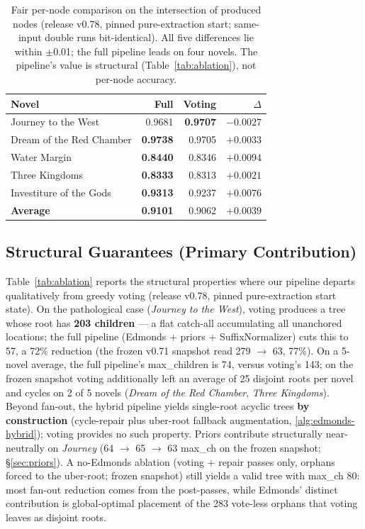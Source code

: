 \documentclass[11pt]{article}
\begin{document}
\begin{table}[h]
\centering
\scriptsize
\setlength{\tabcolsep}{4pt}
\begin{tabular}{lrrr}
\toprule
\textbf{Novel} & \textbf{Full} & \textbf{Voting} & \textbf{$\Delta$} \\
\midrule
Journey to the West & 0.9681 & \textbf{0.9707} & $-0.0027$ \\
Dream of the Red Chamber & \textbf{0.9738} & 0.9705 & $+0.0033$ \\
Water Margin & \textbf{0.8440} & 0.8346 & $+0.0094$ \\
Three Kingdoms & \textbf{0.8333} & 0.8313 & $+0.0021$ \\
Investiture of the Gods & \textbf{0.9313} & 0.9237 & $+0.0076$ \\
\midrule
\textbf{Average} & \textbf{0.9101} & 0.9062 & $+0.0039$ \\
\bottomrule
\end{tabular}
\caption{Fair per-node comparison on the intersection of produced nodes (release v0.78, pinned pure-extraction start; same-input double runs bit-identical). All five differences lie within $\pm$0.01; the full pipeline leads on four novels. The pipeline's value is structural (Table~\ref{tab:ablation}), not per-node accuracy.}
\label{tab:fair}
\end{table}

\subsection{Structural Guarantees (Primary Contribution)}
\label{sec:structural}

Table~\ref{tab:ablation} reports the structural properties where our pipeline departs qualitatively from greedy voting (release v0.78, pinned pure-extraction start state). On the pathological case (\textit{Journey to the West}), voting produces a tree whose root has \textbf{203 children} --- a flat catch-all accumulating all unanchored locations; the full pipeline (Edmonds + priors + SuffixNormalizer) cuts this to 57, a 72\% reduction (the frozen v0.71 snapshot read 279 $\rightarrow$ 63, 77\%). On a 5-novel average, the full pipeline's max\_children is 74, versus voting's 143; on the frozen snapshot voting additionally left an average of 25 disjoint roots per novel and cycles on 2 of 5 novels (\textit{Dream of the Red Chamber}, \textit{Three Kingdoms}). Beyond fan-out, the hybrid pipeline yields single-root acyclic trees \textbf{by construction} (cycle-repair plus uber-root fallback augmentation, \autoref{alg:edmonds-hybrid}); voting provides no such property. Priors contribute structurally near-neutrally on \textit{Journey} (64 $\rightarrow$ 65 $\rightarrow$ 63 max\_ch on the frozen snapshot; \S\ref{sec:priors}). A no-Edmonds ablation (voting + repair passes only, orphans forced to the uber-root; frozen snapshot) still yields a valid tree with max\_ch 80: most fan-out reduction comes from the post-passes, while Edmonds' distinct contribution is global-optimal placement of the 283 vote-less orphans that voting leaves as disjoint roots.
\end{document}
